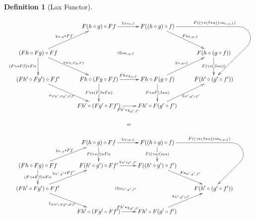 \documentclass{article}
\numberwithin{equation}{section}
\theoremstyle{definition}
\theoremstyle{plain}
\newtheorem{definition}[equation]{Definition}
\begin{document}
\begin{definition}[Lax Functor]
\begin{enumerate}[label = $\bullet$]
		\[\begin{array}{c}
			\xymatrix@R=3em{
				& F(h\circ g) \circ Ff \ar[r]^{\chi_{h\circ g, f}} & F((h\circ g)\circ f) \ar[dr]^{Fa_{h,g,f}} \ar`_dl/20pt[ddr]^(0.7){F((\gamma\star (\beta\star \alpha))\circ a_{h,g,f})}
				[ddr]\\
				(Fh\circ Fg)\circ Ff \ar[d]_{(F\gamma\star F\beta)\star F\alpha} \ar[ur]^{\chi_{h,g}\star Ff} \ar[dr]^{a_{Fh, Fg, Ff}} \ar@{}[rrr]|{\wr\Uparrow \omega_{h,g,f}} &&& F(h \circ (g\circ f)) \ar[d]|{F(\gamma\star (\beta\star \alpha))}\\
				(Fh^{\prime}\circ Fg^{\prime})\circ Ff^{\prime} \ar[dr]_{a_{Fh^{\prime}, Fg^{\prime}, Ff^{\prime}}} & Fh\circ (Fg \circ Ff) \ar[d]|{F\gamma\star (F\beta\star F\alpha)} \ar[r]^{Fh \star \chi_{g, f}} & Fh\circ F(g \circ f) \ar[d]|{F\gamma\star F(\beta\star \alpha)} \ar[ur]^{\chi_{h,g\circ f}} & F(h^{\prime} \circ (g^{\prime}\circ f^{\prime}))\\
				& Fh^{\prime}\circ (Fg^{\prime} \circ Ff^{\prime}) \ar[r]_{Fh^{\prime} \star \chi_{g^{\prime}, f^{\prime}}} & Fh^{\prime}\circ F(g^{\prime} \circ f^{\prime}) \ar[ur]_{\chi_{h^{\prime},g^{\prime}\circ f^{\prime}}}
			}\\
			\\
			=\\
			\\
			\xymatrix{
				& F(h\circ g) \circ Ff \ar[d]|{F(\gamma\star \beta)\star F\alpha} \ar[r]^{\chi_{h\circ g, f}} & F((h\circ g)\circ f) \ar[d]|{F((\gamma\star \beta)\star \alpha)} \ar`_dl/20pt[ddr]^(0.7){F((\gamma\star (\beta\star \alpha))\circ a_{h,g,f})}
				[ddr]\\
				(Fh\circ Fg)\circ Ff \ar[d]|{(F\gamma\star F\beta)\star F\alpha} \ar[ur]^{\chi_{h,g}\star Ff} & F(h^{\prime}\circ g^{\prime}) \circ Ff^{\prime} \ar[r]^{\chi_{h^{\prime}\circ g^{\prime}, f^{\prime}}} & F((h^{\prime}\circ g^{\prime})\circ f^{\prime}) \ar[dr]^{Fa_{h^{\prime},g^{\prime},f^{\prime}}}\\
				(Fh^{\prime}\circ Fg^{\prime})\circ Ff^{\prime} \ar[ur]^{\chi_{h^{\prime},g^{\prime}}\star Ff^{\prime}} \ar[dr]_{1_{Fh^{\prime}\circ Fg^{\prime}\circ Ff^{\prime}}} \ar@{}[rrr]|{\wr\Uparrow \omega_{h^{\prime},g^{\prime},f^{\prime}}} &&& F(h^{\prime} \circ (g^{\prime}\circ f^{\prime}))\\
				& Fh^{\prime}\circ (Fg^{\prime} \circ Ff^{\prime}) \ar[r]^{Fh^{\prime} \star \chi_{g^{\prime}, f^{\prime}}} & Fh^{\prime}\circ F(g^{\prime} \circ f^{\prime}) \ar[ur]^{\chi_{h^{\prime},g^{\prime}\circ f^{\prime}}}\\
			}
		\end{array}\]
		

\end{enumerate}
\end{definition}
\end{document}
